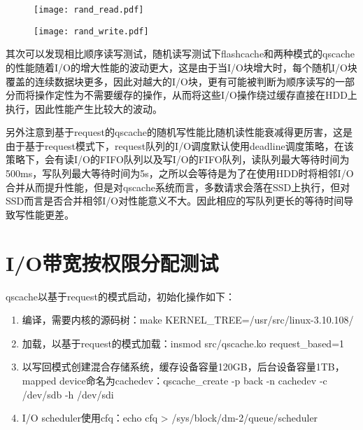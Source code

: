\begin{figure}[!htbp]
    \centering
    \texttt{[image: rand\_read.pdf]}
\end{figure}

\begin{figure}[!htbp]
    \centering
    \texttt{[image: rand\_write.pdf]}
\end{figure}

其次可以发现相比顺序读写测试，随机读写测试下flashcache和两种模式的qscache的性能随着I/O的增大性能的波动更大，这是由于当I/O块增大时，每个随机I/O块覆盖的连续数据块更多，因此对越大的I/O块，更有可能被判断为顺序读写的一部分而将操作定性为不需要缓存的操作，从而将这些I/O操作绕过缓存直接在HDD上执行，因此性能产生比较大的波动。

另外注意到基于request的qscache的随机写性能比随机读性能衰减得更厉害，这是由于基于request模式下，request队列的I/O调度默认使用deadline调度策略，在该策略下，会有读I/O的FIFO队列以及写I/O的FIFO队列，读队列最大等待时间为500ms，写队列最大等待时间为5s，之所以会等待是为了在使用HDD时将相邻I/O合并从而提升性能，但是对qscache系统而言，多数请求会落在SSD上执行，但对SSD而言是否合并相邻I/O对性能意义不大。因此相应的写队列更长的等待时间导致写性能更差。

\section{I/O带宽按权限分配测试}

qscache以基于request的模式启动，初始化操作如下：

\begin{enumerate}
    \item 编译，需要内核的源码树：make KERNEL\_TREE=/usr/src/linux-3.10.108/
    \item 加载，以基于request的模式加载：insmod src/qscache.ko request\_based=1
    \item 以写回模式创建混合存储系统，缓存设备容量120GB，后台设备容量1TB，mapped device命名为cachedev：qscache\_create -p back -n cachedev -c /dev/sdb -h /dev/sdi
    \item I/O scheduler使用cfq：echo cfq > /sys/block/dm-2/queue/scheduler
\end{enumerate}

